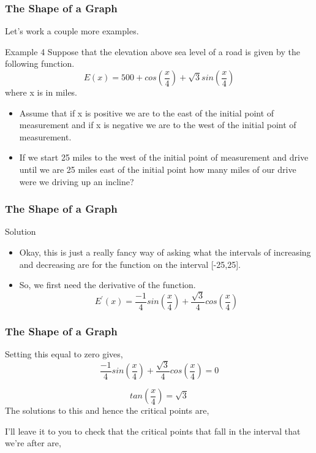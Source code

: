 \documentclass{beamer}
\begin{document}
\begin{frame} 
	\frametitle{The Shape of a Graph}
Let’s work a couple more examples.

Example 4  Suppose that the elevation above sea level of a road is given by the following function.
\[ E(x) = 500 +cos(\frac{x}{4}) + \sqrt{3} sin(\frac{x}{4})\]
where x is in miles. 

\begin{itemize}
	\item  Assume that if x is positive we are to the east of the initial point of measurement and if x is negative we are to the west of the initial point of measurement. 
	
 \item	If we start 25 miles to the west of the initial point of measurement and drive until we are 25 miles east of the initial point how many miles of our drive were we driving up an incline?
\end{itemize}
\end{frame}
\begin{frame} 
	\frametitle{The Shape of a Graph}
Solution
\begin{itemize}
\item Okay, this is just a really fancy way of asking what the intervals of increasing and decreasing are for the function on the interval [-25,25]. 
\item So, we first need the derivative of the function.
\[ E^{\prime}(x) =  \frac{-1}{4}sin(\frac{x}{4}) + \frac{\sqrt{3}}{4} cos(\frac{x}{4})\]
\end{itemize}


\end{frame}
\begin{frame} 
	\frametitle{The Shape of a Graph}
Setting this equal to zero gives,
\[  \frac{-1}{4}sin(\frac{x}{4}) + \frac{\sqrt{3}}{4} cos(\frac{x}{4}) = 0 \]

\[ tan(\frac{x}{4}) =  \sqrt{3} \]
The solutions to this and hence the critical points are,


I’ll leave it to you to check that the critical points that fall in the interval that we’re after are,

\end{frame}
\end{document}
